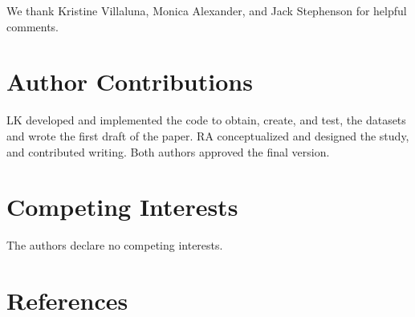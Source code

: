 \documentclass[
  letterpaper,
  DIV=11,
  numbers=noendperiod]{scrartcl}
\begin{document}
We thank Kristine Villaluna, Monica Alexander, and Jack Stephenson for
helpful comments.

\hypertarget{author-contributions}{%
\section{Author Contributions}\label{author-contributions}}

LK developed and implemented the code to obtain, create, and test, the
datasets and wrote the first draft of the paper. RA conceptualized and
designed the study, and contributed writing. Both authors approved the
final version.

\hypertarget{competing-interests}{%
\section{Competing Interests}\label{competing-interests}}

The authors declare no competing interests.

\hypertarget{references}{%
\section*{References}\label{references}}
\end{document}
